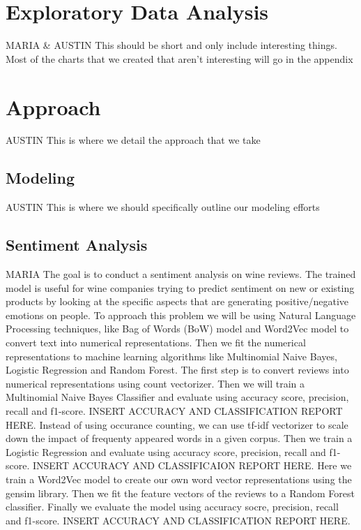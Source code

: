 \documentclass[11pt,english]{article}
\begin{document}
\section{Exploratory Data Analysis}
    MARIA & AUSTIN
    This should be short and only include interesting things. Most of the charts that we created that aren't interesting will go in the appendix

\section{Approach}
    AUSTIN
    This is where we detail the approach that we take

\subsection{Modeling}
    AUSTIN
    This is where we should specifically outline our modeling efforts

\subsection{Sentiment Analysis}
    MARIA
    The goal is to conduct a sentiment analysis on wine reviews. The trained model is useful for wine companies trying to predict sentiment on new or existing products by looking at the specific aspects that are generating positive/negative emotions on people.   
    To approach this problem we will be using Natural Language Processing techniques, like Bag of Words (BoW) model and Word2Vec model to convert text into numerical representations. Then we fit the numerical representations to machine learning algorithms like Multinomial Naive Bayes, Logistic Regression and Random Forest. 
    The first step is to convert reviews into numerical representations using count vectorizer. Then we will train a Multinomial Naive Bayes Classifier and evaluate using accuracy score, precision, recall and f1-score. 
    INSERT ACCURACY AND CLASSIFICATION REPORT HERE.
    Instead of using occurance counting, we can use tf-idf vectorizer to scale down the impact of frequenty appeared words in a given corpus. Then we train a Logistic Regression and evaluate using accuracy score, precision, recall and f1-score. 
    INSERT ACCURACY AND CLASSIFICAION REPORT HERE. 
    Here we train a Word2Vec model to create our own word vector representations using the gensim library. Then we fit the feature vectors of the reviews to a Random Forest classifier. Finally we evaluate the model using accuracy socre, precision, recall and f1-score. 
    INSERT ACCURACY AND CLASSIFICATION REPORT HERE. 
\end{document}
